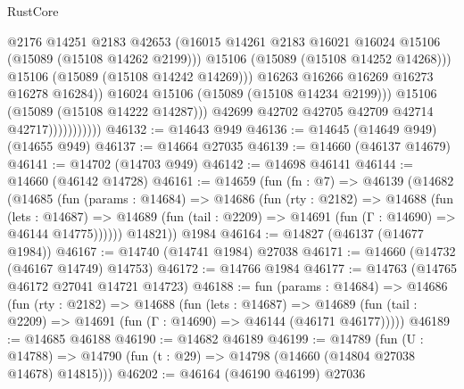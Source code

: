 \begin{lexlean}{RustCore}
\begin{coremodule}
                                      @2176
                                      @14251
                                      @2183
                                      @42653
                                      (@16015
                                        @14261
                                        @2183
                                        @16021
                                        @16024
                                        @15106
                                        (@15089 (@15108 @14262 @2199)))
                                      @15106
                                      (@15089 (@15108 @14252 @14268)))
                                    @15106
                                    (@15089 (@15108 @14242 @14269)))
                                  @16263
                                  @16266
                                  @16269
                                  @16273
                                  @16278
                                  @16284))
                              @16024
                              @15106
                              (@15089 (@15108 @14234 @2199)))
                            @15106
                            (@15089 (@15108 @14222 @14287)))
                          @42699
                          @42702
                          @42705
                          @42709
                          @42714
                          @42717)))))))))))
@46132 := @14643 @949
@46136 := @14645 (@14649 @949) (@14655 @949)
@46137 := @14664 @27035
@46139 := @14660 (@46137 @14679)
@46141 := @14702 (@14703 @949)
@46142 := @14698 @46141
@46144 := @14660 (@46142 @14728)
@46161 := @14659
    (fun (fn : @7) =>
    @46139
      (@14682
        (@14685
          (fun (params : @14684) =>
          @14686
            (fun (rty : @2182) =>
            @14688
              (fun (lets : @14687) =>
              @14689 (fun (tail : @2209) => @14691 (fun (Γ : @14690) => @46144 @14775))))))
        @14821))
    @1984
@46164 := @14827 (@46137 (@14677 @1984))
@46167 := @14740 (@14741 @1984) @27038
@46171 := @14660 (@14732 (@46167 @14749) @14753)
@46172 := @14766 @1984
@46177 := @14763 (@14765 @46172 @27041 @14721 @14723)
@46188 := fun (params : @14684) =>
  @14686
    (fun (rty : @2182) =>
    @14688
      (fun (lets : @14687) =>
      @14689 (fun (tail : @2209) => @14691 (fun (Γ : @14690) => @46144 (@46171 @46177)))))
@46189 := @14685 @46188
@46190 := @14682 @46189
@46199 := @14789
    (fun (U : @14788) => @14790 (fun (t : @29) => @14798 (@14660 (@14804 @27038 @14678) @14815)))
@46202 := @46164 (@46190 @46199) @27036

\end{coremodule}
\end{lexlean}
